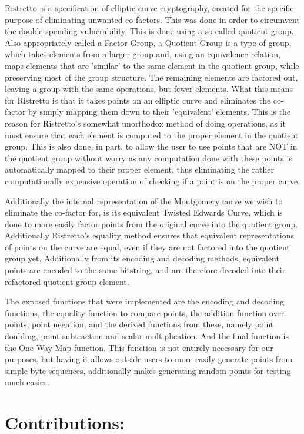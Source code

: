 \documentclass{article}
\begin{document}
Ristretto is a specification of elliptic curve cryptography, created for the specific purpose of eliminating unwanted co-factors. This was done in order to circumvent the double-spending vulnerability. This is done using a so-called quotient group. Also appropriately called a Factor Group, a Quotient Group is a type of group, which takes elements from a larger group and, using an equivalence relation, maps elements that are 'similar' to the same element in the quotient group, while preserving most of the group structure. The remaining elements are factored out, leaving a group with the same operations, but fewer elements. What this means for Ristretto is that it takes points on an elliptic curve and eliminates the co-factor by simply mapping them down to their 'equivalent' elements. This is the reason for Ristretto's somewhat unorthodox method of doing operations, as it must ensure that each element is computed to the proper element in the quotient group. This is also done, in part, to allow the user to use points that are NOT in the quotient group without worry as any computation done with these points is automatically mapped to their proper element, thus eliminating the rather computationally expensive operation of checking if a point is on the proper curve. 

Additionally the internal representation of the Montgomery curve we wish to eliminate the co-factor for, is its equivalent Twisted Edwards Curve, which is done to more easily factor points from the original curve into the quotient group. Additionally Ristretto's equality method ensures that equivalent representations of points on the curve are equal, even if they are not factored into the quotient group yet. Additionally from its encoding and decoding methods, equivalent points are encoded to the same bitstring, and are therefore decoded into their refactored quotient group element.

The exposed functions that were implemented are the encoding and decoding functions, the equality function to compare points, the addition function over points, point negation, and the derived functions from these, namely point doubling, point subtraction and scalar multiplication. And the final function is the One Way Map function. This function is not entirely necessary for our purposes, but having it allows outside users to more easily generate points from simple byte sequences, additionally makes generating random points for testing much easier. 

\section{Contributions:}
\end{document}
